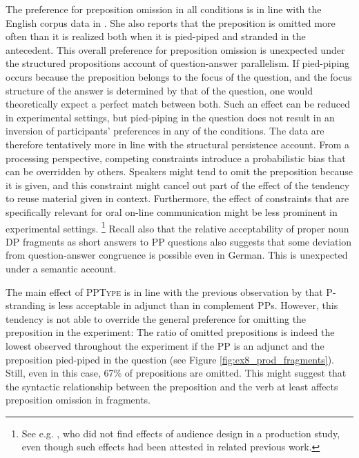 \largerpage
The preference for preposition omission in all conditions is in line with the English corpus data in \citet{nykiel2017}. She also reports that the preposition is omitted more often than it is realized both when it is pied-piped and stranded in the antecedent. This overall preference for preposition omission is unexpected under the structured propositions account of question-answer parallelism. If pied-piping occurs because the preposition belongs to the focus of the question, and the focus structure of the answer is determined by that of the question, one would theoretically expect a perfect match between both. Such an effect can be reduced in experimental settings, but pied-piping in the question does not result in an inversion of participants' preferences in any of the conditions. The data are therefore tentatively more in line with the structural persistence account. From a processing perspective, competing constraints introduce a probabilistic bias that can be overridden by others. Speakers might tend to omit the preposition because it is given, and this constraint might cancel out part of the effect of the tendency to reuse material given in context. Furthermore, the effect of constraints that are specifically relevant for oral on-line communication might be less prominent in experimental settings.%
%
\footnote{See e.g. \citet{zhan.etal2017}, who did not find effects of audience design in a production study, even though such effects had been attested in related previous work.}\afterfn
%
Recall also that the relative acceptability of proper noun DP fragments as short answers to PP questions \citep{lemkeaccepted} also suggests that some deviation from question-answer congruence is possible even in German. This is unexpected under a semantic account.

\noindent The main effect of \textsc{PPType} is in line with the previous observation by \citet{vanriemsdijk1978} that P-stranding is less acceptable in adjunct than in complement PPs. However, this tendency is not able to override the general preference for omitting the preposition in the experiment: The ratio of omitted prepositions is indeed the lowest observed throughout the experiment if the PP is an adjunct and the preposition pied-piped in the question (see Figure \ref{fig:ex8_prod_fragments}). Still, even in this case, 67\% of prepositions are omitted. This might suggest that the syntactic relationship between the preposition and the verb at least affects preposition omission in fragments.


